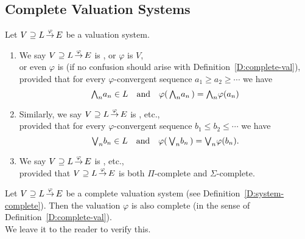 \documentclass[main.tex]{subfiles}
\begin{document}
\subsection{Complete Valuation Systems}
%
%
\begin{dfn}
\label{D:system-complete}
Let $V \supseteq L\,\smash{\stackrel{\varphi}{\rightarrow}}\,E$ be a valuation system.
\begin{enumerate}
\item 
We say $V \supseteq L\,\smash{\stackrel{\varphi}{\rightarrow}}\,E$
is ,
or  $\varphi$ is  $V$,\\
or even $\varphi$ is   (if no confusion should 
arise with
Definition~\ref{D:complete-val}),\\
provided that for every $\varphi$-convergent sequence
$a_1\geq a_2 \geq \dotsb$ we have
\begin{equation*}
   \textstyle{\bigwedge}_n a_n \in L\quad 
  \text{and}\quad
  \varphi(\,\textstyle{\bigwedge}_n a_n\,) = \textstyle{\bigwedge}_n \varphi(a_n)
\end{equation*}

\item
Similarly,
we say $V \supseteq L\,\smash{\stackrel{\varphi}{\rightarrow}}\,E$
is , etc.,\\
provided that for every $\varphi$-convergent sequence
$b_1\leq b_2 \leq \dotsb$ we have
\begin{equation*}
   \textstyle{\bigvee}_n b_n \in L\quad 
  \text{and}\quad
  \varphi(\,\textstyle{\bigvee}_n b_n\,) = \textstyle{\bigvee}_n \varphi(b_n).
\end{equation*}

\item
We say $V \supseteq L\,\smash{\stackrel{\varphi}{\rightarrow}}\,E$
is , etc.,\\
provided that 
$V \supseteq L\,\smash{\stackrel{\varphi}{\rightarrow}}\,E$
is both $\Pi$-complete and $\Sigma$-complete.
\end{enumerate}
\end{dfn}
%
%
\begin{rem}
Let $V \supseteq L\,\smash{\stackrel{\varphi}{\rightarrow}}\,E$ be a complete valuation
system
(see Definition~\ref{D:system-complete}).
Then the valuation $\varphi$
is also complete (in the sense
of Definition~\ref{D:complete-val}).\\
We leave it to the reader to verify this.
\end{rem}
%
%
\end{document}
